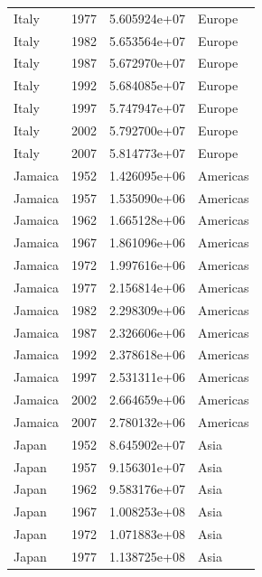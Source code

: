 \documentclass[
  letterpaper,
  DIV=11,
  numbers=noendperiod]{scrreprt}
\begin{document}
\begin{tcolorbox}
\begin{tabular}{lrrl}
Italy                    &  1977 &  5.605924e+07 &    Europe \\
Italy                    &  1982 &  5.653564e+07 &    Europe \\
Italy                    &  1987 &  5.672970e+07 &    Europe \\
Italy                    &  1992 &  5.684085e+07 &    Europe \\
Italy                    &  1997 &  5.747947e+07 &    Europe \\
Italy                    &  2002 &  5.792700e+07 &    Europe \\
Italy                    &  2007 &  5.814773e+07 &    Europe \\
Jamaica                  &  1952 &  1.426095e+06 &  Americas \\
Jamaica                  &  1957 &  1.535090e+06 &  Americas \\
Jamaica                  &  1962 &  1.665128e+06 &  Americas \\
Jamaica                  &  1967 &  1.861096e+06 &  Americas \\
Jamaica                  &  1972 &  1.997616e+06 &  Americas \\
Jamaica                  &  1977 &  2.156814e+06 &  Americas \\
Jamaica                  &  1982 &  2.298309e+06 &  Americas \\
Jamaica                  &  1987 &  2.326606e+06 &  Americas \\
Jamaica                  &  1992 &  2.378618e+06 &  Americas \\
Jamaica                  &  1997 &  2.531311e+06 &  Americas \\
Jamaica                  &  2002 &  2.664659e+06 &  Americas \\
Jamaica                  &  2007 &  2.780132e+06 &  Americas \\
Japan                    &  1952 &  8.645902e+07 &      Asia \\
Japan                    &  1957 &  9.156301e+07 &      Asia \\
Japan                    &  1962 &  9.583176e+07 &      Asia \\
Japan                    &  1967 &  1.008253e+08 &      Asia \\
Japan                    &  1972 &  1.071883e+08 &      Asia \\
Japan                    &  1977 &  1.138725e+08 &      Asia \\

\end{tabular}
\end{tcolorbox}
\end{document}
